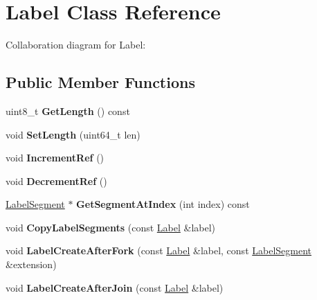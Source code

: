 \hypertarget{classLabel}{\section{Label Class Reference}
\label{classLabel}
}


Collaboration diagram for Label\-:
\subsection*{Public Member Functions}
\begin{DoxyCompactItemize}
\item 
\hypertarget{classLabel_a3d24d0fa7b7143b026bd23997a06c296}{uint8\-\_\-t {\bfseries Get\-Length} () const }\label{classLabel_a3d24d0fa7b7143b026bd23997a06c296}

\item 
\hypertarget{classLabel_a475dc352b81f8b64683d54ff3fe8d5be}{void {\bfseries Set\-Length} (uint64\-\_\-t len)}\label{classLabel_a475dc352b81f8b64683d54ff3fe8d5be}

\item 
\hypertarget{classLabel_a50e658323137aefd599f0bc7f8d6fd6e}{void {\bfseries Increment\-Ref} ()}\label{classLabel_a50e658323137aefd599f0bc7f8d6fd6e}

\item 
\hypertarget{classLabel_a9e5b99342ddd639decfc651e5244b401}{void {\bfseries Decrement\-Ref} ()}\label{classLabel_a9e5b99342ddd639decfc651e5244b401}

\item 
\hypertarget{classLabel_af736ace059589eeee09cd026ed971cdf}{\hyperlink{structLabelSegment}{Label\-Segment} $\ast$ {\bfseries Get\-Segment\-At\-Index} (int index) const }\label{classLabel_af736ace059589eeee09cd026ed971cdf}

\item 
\hypertarget{classLabel_ad955a0f57fd172dbd14f0303e4501aa9}{void {\bfseries Copy\-Label\-Segments} (const \hyperlink{classLabel}{Label} \&label)}\label{classLabel_ad955a0f57fd172dbd14f0303e4501aa9}

\item 
\hypertarget{classLabel_a9499c1f80b21413facd34e17d0d40f25}{void {\bfseries Label\-Create\-After\-Fork} (const \hyperlink{classLabel}{Label} \&label, const \hyperlink{structLabelSegment}{Label\-Segment} \&extension)}\label{classLabel_a9499c1f80b21413facd34e17d0d40f25}

\item 
\hypertarget{classLabel_ae17efa5ab74875313f0ee39e36c1aae6}{void {\bfseries Label\-Create\-After\-Join} (const \hyperlink{classLabel}{Label} \&label)}\label{classLabel_ae17efa5ab74875313f0ee39e36c1aae6}


\end{DoxyCompactItemize}
